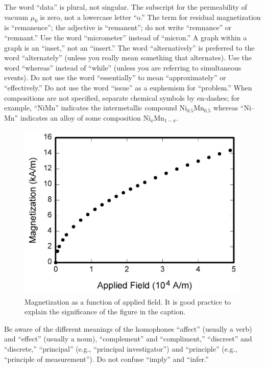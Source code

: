 \documentclass[journal,twoside,web]{ieeecolor2}
\begin{document}
The word ``data'' is plural, not singular. The subscript for the 
permeability of vacuum $\mu _{0}$ is zero, not a lowercase letter 
``o.'' The term for residual magnetization is ``remanence''; the adjective 
is ``remanent''; do not write ``remnance'' or ``remnant.'' Use the word 
``micrometer'' instead of ``micron.'' A graph within a graph is an 
``inset,'' not an ``insert.'' The word ``alternatively'' is preferred to the 
word ``alternately'' (unless you really mean something that alternates). Use 
the word ``whereas'' instead of ``while'' (unless you are referring to 
simultaneous events). Do not use the word ``essentially'' to mean 
``approximately'' or ``effectively.'' Do not use the word ``issue'' as a 
euphemism for ``problem.'' When compositions are not specified, separate 
chemical symbols by en-dashes; for example, ``NiMn'' indicates the 
intermetallic compound Ni$_{0.5}$Mn$_{0.5}$ whereas 
``Ni--Mn'' indicates an alloy of some composition 
Ni$_{x}$Mn$_{1-x}$.

\begin{figure}[!t]
\centerline{\includegraphics[width=\columnwidth]{fig1.png}}
\caption{Magnetization as a function of applied field.
It is good practice to explain the significance of the figure in the caption.}
\label{fig1}
\end{figure}

Be aware of the different meanings of the homophones ``affect'' (usually a 
verb) and ``effect'' (usually a noun), ``complement'' and ``compliment,'' 
``discreet'' and ``discrete,'' ``principal'' (e.g., ``principal 
investigator'') and ``principle'' (e.g., ``principle of measurement''). Do 
not confuse ``imply'' and ``infer.'' 
\end{document}
